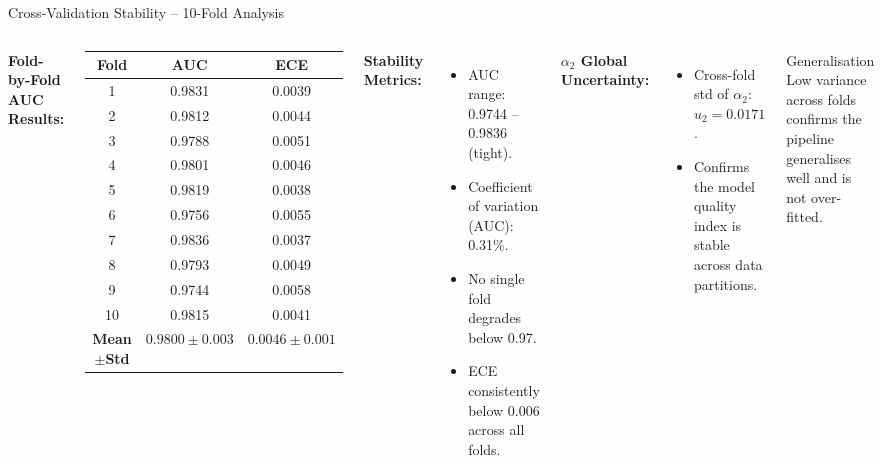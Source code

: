 \documentclass[aspectratio=169]{beamer}
\begin{document}
\begin{frame}{Cross-Validation Stability -- 10-Fold Analysis}
  \begin{columns}[T]
      \textbf{Fold-by-Fold AUC Results:}
      \begin{center}\small
      \begin{tabular}{@{}ccc@{}}
        \toprule
        \textbf{Fold} & \textbf{AUC} & \textbf{ECE} \\
        \midrule
        1  & 0.9831 & 0.0039 \\
        2  & 0.9812 & 0.0044 \\
        3  & 0.9788 & 0.0051 \\
        4  & 0.9801 & 0.0046 \\
        5  & 0.9819 & 0.0038 \\
        6  & 0.9756 & 0.0055 \\
        7  & 0.9836 & 0.0037 \\
        8  & 0.9793 & 0.0049 \\
        9  & 0.9744 & 0.0058 \\
        10 & 0.9815 & 0.0041 \\
        \midrule
        \textbf{Mean$\pm$Std} & $0.9800\pm0.003$ & $0.0046\pm0.001$ \\
        \bottomrule
      \end{tabular}
      \end{center}
      \textbf{Stability Metrics:}
      \begin{itemize}\small
        \item AUC range: 0.9744 -- 0.9836 (tight).
        \item Coefficient of variation (AUC): 0.31\%.
        \item No single fold degrades below 0.97.
        \item ECE consistently below 0.006 across all folds.
      \end{itemize}
      \vspace{0.3em}
      \textbf{$\alpha_2$ Global Uncertainty:}
      \begin{itemize}\small
        \item Cross-fold std of $\alpha_2$: $u_2 = 0.0171$.
        \item Confirms the model quality index is
              stable across data partitions.
      \end{itemize}
      \begin{block}{Generalisation}
        Low variance across folds confirms the pipeline
        generalises well and is not over-fitted.
      \end{block}
  \end{columns}
\end{frame}
\end{document}
